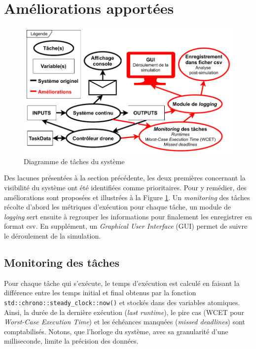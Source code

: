 \documentclass[journal]{IEEEtran}
\begin{document}
\section{Améliorations apportées}\label{ameliorations}
\begin{figure}
	\centering
	\captionsetup{justification=centering}
	\includegraphics[width=\linewidth]{diagrammeDeTaches_Simple.pdf}
	\caption{Diagramme de tâches du système}
	\label{taskDiagram}
\end{figure}

Des lacunes présentées à la section précédente, les deux premières concernant la visibilité du système ont été identifiées comme prioritaires. 
Pour y remédier, des améliorations sont proposées et illustrées à la Figure \ref{taskDiagram}. Un \textit{monitoring} des tâches récolte d'abord les métriques d'exécution pour chaque tâche, un module de \textit{logging} sert ensuite à regrouper les informations pour finalement les enregistrer en format csv. En supplément, un \textit{Graphical User Interface} (GUI) permet de suivre le déroulement de la simulation.

\subsection{Monitoring des tâches}

Pour chaque tâche qui s'exécute, le temps d'exécution est calculé en faisant la différence entre les temps initial et final obtenus par la fonction \verb|std::chrono::steady_clock::now()| et stockés dans des variables atomiques. Ainsi, la durée de la dernière exécution (\textit{last runtime}), le pire cas (WCET pour \textit{Worst-Case Execution Time}) et les échéances manquées (\textit{missed deadlines}) sont comptabilisés. Notons, que l'horloge du système, avec sa granularité d'une milliseconde, limite la précision des données.
\end{document}
